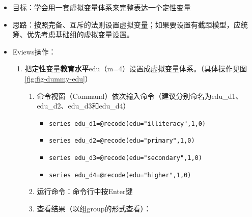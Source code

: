 \documentclass[12pt,(landscape,a4paper),(portrait,a4paper)]{article}
\providecommand{\tightlist}{%
  \setlength{\itemsep}{0pt}\setlength{\parskip}{0pt}}
\theoremstyle{definition}
\theoremstyle{definition}
\theoremstyle{definition}
\theoremstyle{remark}
\begin{document}
\begin{itemize}
\item
  目标：学会用一套虚拟变量体系来完整表达一个定性变量
\item
  思路：按照完备、互斥的法则设置虚拟变量；如果要设置有截距模型，应统筹、优先考虑基础组的虚拟变量设置。
\item
  Eviews操作：

  \begin{enumerate}
  \def\labelenumi{\arabic{enumi})}
  \tightlist
  \item
    把定性变量\textbf{教育水平}edu（m=4）设置成虚拟变量体系。（具体操作见图\ref{fig:fig-dummy-edu}）

    \begin{enumerate}
    \def\labelenumii{\alph{enumii}.}
    \tightlist
    \item
      命令视窗（Command）依次输入命令（建议分别命名为edu\_d1、edu\_d2、edu\_d3和edu\_d4）

      \begin{itemize}
      \tightlist
      \item
        \texttt{series\ edu\_d1=@recode(edu="illiteracy",1,0)\textquotesingle{}}
      \item
        \texttt{series\ edu\_d2=@recode(edu="primary",1,0)\textquotesingle{}}
      \item
        \texttt{series\ edu\_d3=@recode(edu="secondary",1,0)}
      \item
        \texttt{series\ edu\_d4=@recode(edu="higher",1,0)\textquotesingle{}}
      \end{itemize}
    \item
      运行命令：命令行中按Enter键\\
    \item
      查看结果（以组group的形式查看）：


\end{enumerate}
\end{enumerate}
\end{itemize}
\end{document}
